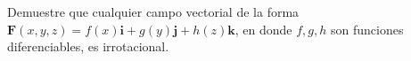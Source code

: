 \item Demuestre que cualquier campo vectorial de la forma $\mathbf{F}(x,y,z) = f(x)\mathbf{i} + g(y)\mathbf{j} + h(z)\mathbf{k}$, en donde $f, g, h$ son funciones diferenciables, es irrotacional.
